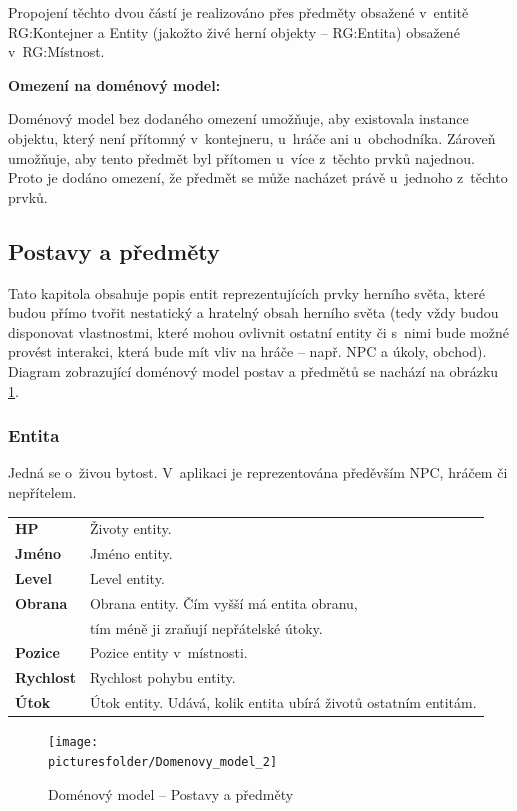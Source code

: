 \documentclass[12pt,a4paper]{article}
\def\picturesfolder{obrazky}
\begin{document}
Propojení těchto dvou částí je realizováno přes předměty obsažené v~entitě
RG:Kontejner a Entity (jakožto živé herní objekty -- RG:Entita) obsažené
v~RG:Místnost.

\bigskip
\noindent
\bf
Omezení na doménový model:
\rm

Doménový model bez dodaného omezení umožňuje, aby existovala instance objektu,
který není přítomný v~kontejneru, u~hráče ani u~obchodníka. Zároveň umožňuje,
aby tento předmět byl přítomen u~více z~těchto prvků najednou. Proto je dodáno
omezení, že předmět se může nacházet právě u~jednoho z~těchto prvků.

\subsection{Postavy a předměty}
Tato kapitola obsahuje popis entit reprezentujících prvky herního světa, které
budou přímo tvořit nestatický a hratelný obsah herního světa (tedy vždy budou
disponovat vlastnostmi, které mohou ovlivnit ostatní entity či s~nimi bude možné
provést interakci, která bude mít vliv na hráče -- např. NPC a úkoly, obchod).
Diagram zobrazující doménový model postav a předmětů se nachází na obrázku
\ref{domenovy:postavy}.

\subsubsection{Entita}
Jedná se o~živou bytost. V~aplikaci je reprezentována předěvším NPC, hráčem či
nepřítelem. \\[5pt]

\begin{tabular*}{0.87\textwidth}{ll}
  \bf HP & Životy entity. \\ [7pt]
  \bf Jméno & Jméno entity. \\ [7pt]
  \bf Level & Level entity. \\ [7pt]
  \bf Obrana & Obrana entity. Čím vyšší má entita obranu,\\
  \bf        & tím méně ji zraňují nepřátelské útoky. \\ [7pt]
  \bf Pozice & Pozice entity v~místnosti. \\ [7pt]
  \bf Rychlost & Rychlost pohybu entity. \\ [7pt]
  \bf Útok & Útok entity. Udává, kolik entita ubírá životů ostatním entitám. \\ [7pt]
\end{tabular*}

\begin{figure}
\begin{center}
  \texttt{[image: \\picturesfolder/Domenovy\_model\_2]}
  \caption{Doménový model -- Postavy a předměty}
  \label{domenovy:postavy}
\end{center}
\end{figure}
\end{document}

